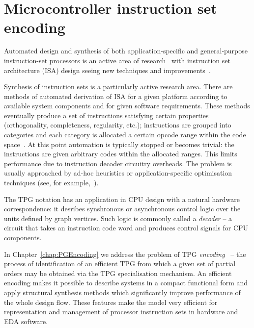 \section{Microcontroller instruction set encoding}

Automated design and synthesis of both application-specific and general-purpose
instruction-set processors is an active area of research~\cite{2006_dutt_chapter}
with instruction set architecture (ISA) design seeing new techniques and improvements~\cite{2002_qin_date}.


Synthesis of instruction sets is a particularly active research area.
There are methods of automated derivation of ISA for a given platform
according to available system components
and for given software requirements. These methods eventually produce a
set of instructions satisfying certain properties (orthogonality,
completeness, regularity, etc.); instructions are grouped into categories
and each category is allocated a certain opcode range within the
code space~\cite{2003_nohl_dac}. At this point automation is typically
stopped or becomes trivial: the instructions are given arbitrary codes
within the allocated ranges. This limits performance due to instruction
decoder circuitry overheads. The problem is usually approached by
ad-hoc heuristics or application-specific optimisation techniques
(see, for example,~\cite{2002_lee_iccad}).

The TPG notation has an application in CPU design with a natural hardware correspondence: it desribes synshronous or asynchronous control logic over the units defined by graph vertices. Such logic is commonly called a \emph{decoder} -- a circuit that takes an instruction code word and produces control signals for CPU components.  

In Chapter~\ref{chap:PGEncoding} we address the problem of TPG \emph{encoding}~\cite{2009_mokhov_phd} -- the process of identification of an efficient TPG from which a given set of partial orders may be obtained via the TPG specialisation mechanism. An efficient encoding makes it possible to describe systems in
a compact functional form and apply structural synthesis methods which
significantly improve performance of the whole design flow. These
features make the model very efficient for representation and management
of processor instruction sets in hardware and EDA software. 

